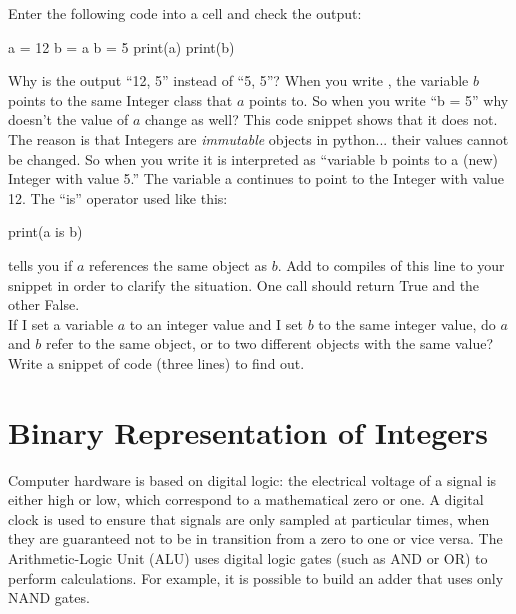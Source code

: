 \plot Enter the following code into a cell and check the output:
\begin{python}
a = 12
b = a
b = 5
print(a)
print(b)
\end{python}  
Why is the output ``12, 5'' instead of ``5, 5''?  When you write
, the variable $b$ points to the same Integer class that
$a$ points to.  So when you write ``b = 5'' why doesn't the value of
$a$ change as well?  This code snippet shows that it does not.  The
reason is that Integers are {\em immutable} objects in python... their
values cannot be changed.  So when you write  it is
interpreted as ``variable b points to a (new) Integer with value 5.''
The variable a continues to point to the Integer with value 12.  The
``is'' operator used like this:
\begin{python}
  print(a is b)
\end{python}
tells you if $a$ references the same object as $b$.  Add to compiles
of this line to your snippet in order to clarify the situation.  One
call should return True and the other False.\\

\plot If I set a variable $a$ to an integer value and I set $b$ to
the same integer value, do $a$ and $b$ refer to the same object, or to
two different objects with the same value?  Write a snippet of code
(three lines) to find out.\\

\section{Binary Representation of Integers}

Computer hardware is based on digital logic: the electrical voltage of
a signal is either high or low, which correspond to a mathematical
zero or one.  A digital clock is used to ensure that signals are only
sampled at particular times, when they are guaranteed not to be in
transition from a zero to one or vice versa.  The Arithmetic-Logic
Unit (ALU) uses digital logic gates (such as AND or OR) to perform
calculations.  For example, it is possible to build an adder that uses
only NAND gates.

